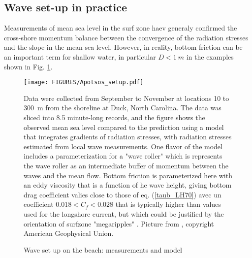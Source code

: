 \subsection{Wave set-up in practice}
Measurements of mean sea level in the surf zone haev generaly confirmed the cross-shore momentum balance between the convergence of the radiation stresses and the slope in the mean sea level. However, in reality, bottom friction can be an important term for shallow water, in particular $D < 1~m$ in the examples shown in Fig. \ref{Apotsos_setup}. 
\begin{figure}
\centerline{\texttt{[image: FIGURES/Apotsos\_setup.pdf]}}
  \caption{Wave set up on the beach: measurements and model}
    {Data were collected from September to November at locations 10 to 300~m from the shoreline at Duck, North Carolina. The data was sliced into 8.5 minute-long records, and the figure shows the observed mean sea level compared to the prediction using a model that integrates gradients of radiation stresses, with radiation stresses estimated from local wave measurements. One flavor of the model includes a parameterization for a "wave roller" which is represents the wave roller as an intermediate buffer of momentum between the waves and the mean flow. Bottom friction is parameterized here with an eddy viscosity that is a function of he wave height, giving bottom drag coefficient valies close to those of eq. (\ref{taub_LH70}) 
avec un coefficient $0.018 <C_f< 0.028$
that is typically higher than values used for the longshore current, but which could be justified by the orientation of surfzone "megaripples" \citep{Gallagher&al.1998}. Picture from  \cite{Apotsos&al.2007}, copyright American Geophysical Union.}
\label{Apotsos_setup}
\end{figure}

